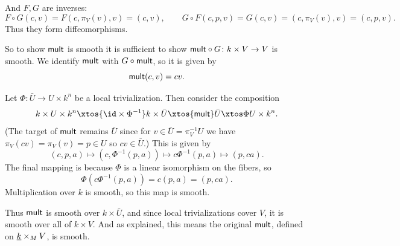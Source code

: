     And $F,G$ are inverses:
    $$ F\circ G(c,v) = F(c,\pi_V(v),v) = (c,v),\qquad G\circ F(c,p,v) = G(c,v) = (c,\pi_V(v),v) = (c,p,v) . $$
    Thus they form diffeomorphisms.

    So to show ${\sf mult}$ is smooth it is sufficient to show ${\sf mult}\circ G\colon k\times V\to V$ is smooth.
    We identify ${\sf mult}$ with $G\circ{\sf mult}$, so it is given by
    $$ {\sf mult}(c,v) = cv . $$

    Let $\Phi\colon\bar U\to U\times k^n$ be a local trivialization.
    Then consider the composition
    $$ k\times U\times k^n \xtos{\id\times\Phi^{-1}} k\times\bar U \xtos{\mult} \bar U \xtos\Phi U\times k^n . $$
    (The target of ${\sf mult}$ remains $\bar U$ since for $v\in\bar U=\pi_V^{-1}U$ we have $\pi_V(cv)=\pi_V(v)=p\in U$ so
    $cv\in\bar U$.)
    This is given by
    $$ (c,p,a) \mapsto (c,\Phi^{-1}(p,a)) \mapsto c\Phi^{-1}(p,a) \mapsto (p,ca) . $$
    The final mapping is because $\Phi$ is a linear isomorphism on the fibers, so
    $$ \Phi(c\Phi^{-1}(p,a)) = c(p,a) = (p,ca) . $$
    Multiplication over $k$ is smooth, so this map is smooth.

    Thus ${\sf mult}$ is smooth over $k\times\bar U$, and since local trivializations cover $V$, it is smooth over all of
    $k\times V$.
    And as explained, this means the original ${\sf mult}$, defined on $\underline k\times_MV$, is smooth.
\eenum


